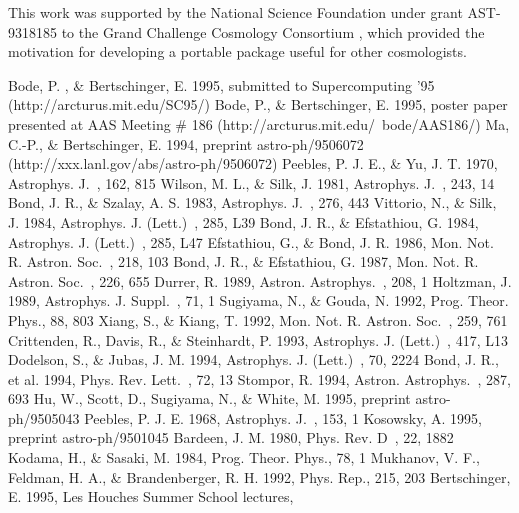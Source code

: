 This work was supported by the National Science Foundation under grant
AST-9318185 to the Grand Challenge Cosmology Consortium \cite{gc3}, which
provided the motivation for developing a portable package useful for other
cosmologists.


\def\aa{{Astron. Astrophys.}\ }
\def\araa{{Ann. Rev. Astron. Astrophys.}\ }
\def\apj{{Astrophys. J.}\ }
\def\apjl{{Astrophys. J. (Lett.)}\ }
\def\apjs{{Astrophys. J. Suppl.}\ }
\def\mnras{{Mon. Not. R. Astron. Soc.}\ }
\def\nature{{Nature}\ }
\def\prd{{Phys. Rev. D}\ }
\def\prl{{Phys. Rev. Lett.}\ }
\def\rmp{{Rev. Mod. Phys.}\ }

\begin{thebibliography}{99}

 Bode, P. , \& Bertschinger, E. 1995, submitted to
    Supercomputing '95 (http://arcturus.mit.edu/SC95/)
 Bode, P., \& Bertschinger, E. 1995, poster paper
    presented at AAS Meeting \# 186 (http://arcturus.mit.edu/~bode/AAS186/)
 Ma, C.-P., \& Bertschinger, E. 1994, preprint astro-ph/9506072
    (http://xxx.lanl.gov/abs/astro-ph/9506072)
 Peebles, P. J. E., \& Yu, J. T. 1970, \apj, 162, 815
 Wilson, M. L., \& Silk, J. 1981, \apj, 243, 14
 Bond, J. R., \& Szalay, A. S. 1983, \apj, 276, 443
 Vittorio, N., \& Silk, J. 1984, \apjl, 285, L39
 Bond, J. R., \& Efstathiou, G. 1984, \apjl, 285, L47
 Efstathiou, G., \& Bond, J. R. 1986, \mnras, 218, 103
 Bond, J. R., \& Efstathiou, G. 1987, \mnras, 226, 655
 Durrer, R. 1989, \aa, 208, 1
 Holtzman, J. 1989, \apjs, 71, 1
 Sugiyama, N., \& Gouda, N. 1992, Prog. Theor. Phys., 88, 803
 Xiang, S., \& Kiang, T. 1992, \mnras, 259, 761
 Crittenden, R., Davis, R., \& Steinhardt, P. 1993, \apjl,
    417, L13
 Dodelson, S., \& Jubas, J. M. 1994, \apjl, 70, 2224 
 Bond, J. R., et al. 1994, \prl, 72, 13
 Stompor, R. 1994, \aa, 287, 693
 Hu, W., Scott, D., Sugiyama, N., \& White, M. 1995,
        preprint astro-ph/9505043
 Peebles, P. J. E. 1968, \apj, 153, 1
 Kosowsky, A. 1995, preprint astro-ph/9501045
 Bardeen, J. M. 1980, \prd, 22, 1882
 Kodama, H., \& Sasaki, M. 1984, Prog. Theor. Phys., 78, 1
 Mukhanov, V. F., Feldman, H. A., \& Brandenberger, R. H.
    1992, Phys. Rep., 215, 203
 Bertschinger, E. 1995, Les Houches Summer School lectures,

\end{thebibliography}
